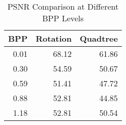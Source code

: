 \begin{table}[h]
\centering
\caption{PSNR Comparison at Different BPP Levels}
\label{tab:psnr_comparison}
\begin{tabular}{rrr}
\toprule
BPP & Rotation & Quadtree \\
\midrule
0.01 & 68.12 & 61.86 \\
0.30 & 54.59 & 50.67 \\
0.59 & 51.41 & 47.72 \\
0.88 & 52.81 & 44.85 \\
1.18 & 52.81 & 50.54 \\
\bottomrule
\end{tabular}
\end{table}